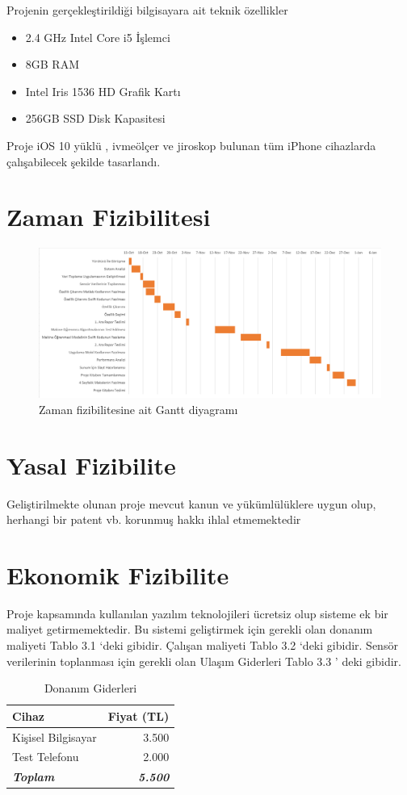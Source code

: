 Projenin gerçekleştirildiği bilgisayara ait teknik özellikler
\begin{itemize}
  \item 2.4 GHz Intel Core i5 İşlemci
  \item 8GB RAM
  \item Intel Iris 1536 HD Grafik Kartı
  \item 256GB SSD Disk Kapasitesi
\end{itemize}

Proje iOS 10 yüklü , ivmeölçer ve jiroskop bulunan tüm iPhone cihazlarda çalışabilecek şekilde tasarlandı.

\section{Zaman Fizibilitesi}
\begin{figure}[!htbp]
\centering
\includegraphics[width=\textwidth]{projectChapters/images/gantt.png}
\caption{Zaman fizibilitesine ait Gantt diyagramı}
\end{figure}

\section{Yasal Fizibilite}
Geliştirilmekte olunan proje mevcut kanun ve yükümlülüklere uygun olup, herhangi bir patent vb. korunmuş hakkı 
ihlal etmemektedir
\newpage
\section{Ekonomik Fizibilite}
Proje kapsamında kullanılan yazılım teknolojileri ücretsiz olup sisteme ek bir maliyet getirmemektedir. Bu sistemi geliştirmek için gerekli olan donanım maliyeti Tablo 3.1 ‘deki gibidir. Çalışan maliyeti Tablo 3.2 ‘deki gibidir. Sensör verilerinin toplanması için gerekli olan Ulaşım Giderleri Tablo 3.3 ' deki gibidir.
\begin{table}[!h]
\centering
\caption{Donanım Giderleri}
\begin{tabular}{|l|r|}
\hline
\textbf{Cihaz}           & \textbf{Fiyat (TL)}     \\ \hline
Kişisel Bilgisayar       & 3.500                   \\ \hline
Test Telefonu            & 2.000                   \\ \hline
\textit{\textbf{Toplam}} & \textit{\textbf{5.500}} \\ \hline
\end{tabular}
\end{table}

